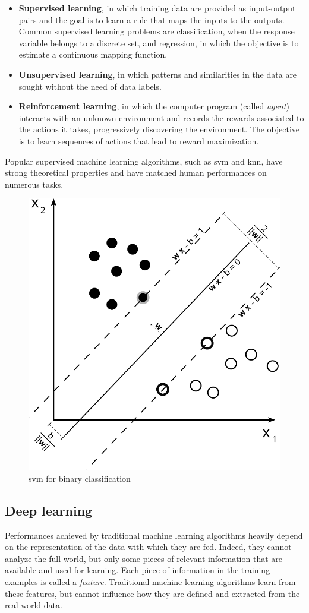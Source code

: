 \documentclass[%
    corpo=12pt,
    twoside,
    stile=classica,   
    tipotesi=magistrale,
    evenboxes,
    english,
	numerazioneromana,
]{toptesi}
\begin{document}
\begin{itemize}
	\item \textbf{Supervised learning}, in which training data are provided as input-output pairs and the goal is to learn a rule that maps the inputs to the outputs. Common supervised learning problems are classification, when the response variable belongs to a discrete set, and regression, in which the objective is to estimate a continuous mapping function.
	\item \textbf{Unsupervised learning}, in which patterns and similarities in the data are sought without the need of data labels.
	\item \textbf{Reinforcement learning}, in which the computer program (called \textit{agent}) interacts with an unknown environment and records the rewards associated to the actions it takes, progressively discovering the environment. The objective is to learn sequences of actions that lead to reward maximization.
\end{itemize}

Popular supervised machine learning algorithms, such as \gls{svm} and \gls{knn}, have strong theoretical properties and have matched human performances on numerous tasks.

\begin{figure}[ht]
	\centering
	\includegraphics[width=.45\linewidth]{imgs/svm.png}
	\caption{\Gls{svm} for binary classification}
	\label{fig:supervised}
\end{figure}

\subsection{Deep learning}
Performances achieved by traditional machine learning algorithms heavily depend on the representation of the data with which they are fed. Indeed, they cannot analyze the full world, but only some pieces of relevant information that are available and used for learning. Each piece of information in the training examples is called a \textit{feature}. Traditional machine learning algorithms learn from these features, but cannot influence how they are defined and extracted from the real world data.
\end{document}
